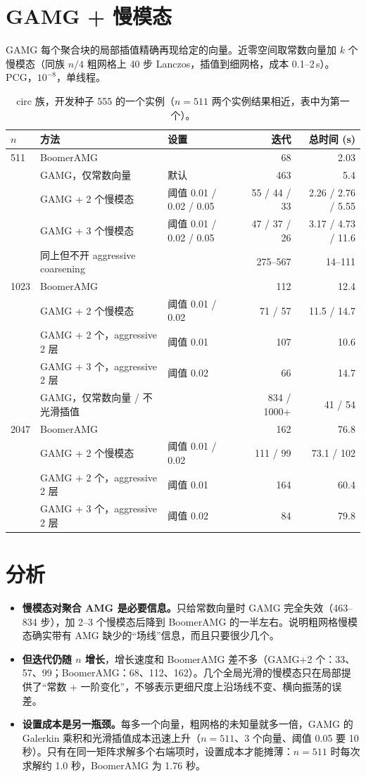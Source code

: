 \documentclass[11pt,a4paper]{ctexart}
\begin{document}
\section{GAMG + 慢模态}
GAMG 每个聚合块的局部插值精确再现给定的向量。近零空间取常数向量加 $k$ 个慢模态（同族 $n/4$ 粗网格上 40 步 Lanczos，插值到细网格，成本 0.1--2\,s）。PCG，$10^{-8}$，单线程。
\begin{table}[H]
\centering\footnotesize
\begin{tabular}{lllrr}
\toprule
$n$ & 方法 & 设置 & 迭代 & 总时间 (s) \\
\midrule
511 & BoomerAMG & & 68 & 2.03 \\
 & GAMG，仅常数向量 & 默认 & 463 & 5.4 \\
 & GAMG + 2 个慢模态 & 阈值 0.01 / 0.02 / 0.05 & 55 / 44 / 33 & 2.26 / 2.76 / 5.55 \\
 & GAMG + 3 个慢模态 & 阈值 0.01 / 0.02 / 0.05 & 47 / 37 / 26 & 3.17 / 4.73 / 11.6 \\
 & 同上但不开 aggressive coarsening & & 275--567 & 14--111 \\
\midrule
1023 & BoomerAMG & & 112 & 12.4 \\
 & GAMG + 2 个慢模态 & 阈值 0.01 / 0.02 & 71 / 57 & 11.5 / 14.7 \\
 & GAMG + 2 个，aggressive 2 层 & 阈值 0.01 & 107 & 10.6 \\
 & GAMG + 3 个，aggressive 2 层 & 阈值 0.02 & 66 & 14.7 \\
 & GAMG，仅常数向量 / 不光滑插值 & & 834 / 1000+ & 41 / 54 \\
\midrule
2047 & BoomerAMG & & 162 & 76.8 \\
 & GAMG + 2 个慢模态 & 阈值 0.01 / 0.02 & 111 / 99 & 73.1 / 102 \\
 & GAMG + 2 个，aggressive 2 层 & 阈值 0.01 & 164 & 60.4 \\
 & GAMG + 3 个，aggressive 2 层 & 阈值 0.02 & 84 & 79.8 \\
\bottomrule
\end{tabular}
\caption{circ 族，开发种子 555 的一个实例（$n=511$ 两个实例结果相近，表中为第一个）。}
\end{table}

\section{分析}
\begin{itemize}
\item \textbf{慢模态对聚合 AMG 是必要信息。}只给常数向量时 GAMG 完全失效（463--834 步），加 2--3 个慢模态后降到 BoomerAMG 的一半左右。说明粗网格慢模态确实带有 AMG 缺少的“场线”信息，而且只要很少几个。
\item \textbf{但迭代仍随 $n$ 增长}，增长速度和 BoomerAMG 差不多（GAMG+2 个：33、57、99；BoomerAMG：68、112、162）。几个全局光滑的慢模态只在局部提供了“常数 + 一阶变化”，不够表示更细尺度上沿场线不变、横向振荡的误差。
\item \textbf{设置成本是另一瓶颈。}每多一个向量，粗网格的未知量就多一倍，GAMG 的 Galerkin 乘积和光滑插值成本迅速上升（$n=511$、3 个向量、阈值 0.05 要 10 秒）。只有在同一矩阵求解多个右端项时，设置成本才能摊薄：$n=511$ 时每次求解约 1.0 秒，BoomerAMG 为 1.76 秒。
\end{itemize}
\end{document}
